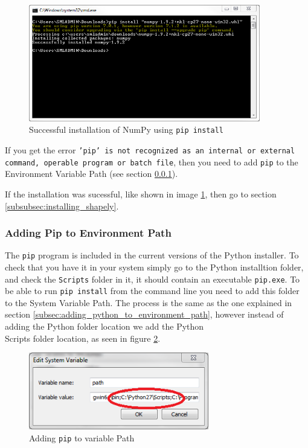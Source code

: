 \begin{figure}[h!]
  \centering
    \includegraphics[width=0.9\textwidth]{numpy_install_success}
    \caption{Successful installation of NumPy using \texttt{pip install} \label{fig:numpy_install_success} }
\end{figure}

If you get the error \texttt{'pip' is not recognized as an internal or external command, operable program or batch file}, then you need to add \texttt{pip} to the Environment Variable Path (see section \ref{subsubsec:adding_pip_to_path}).

If the installation was sucessful, like shown in image \ref{fig:numpy_install_success}, then go to section \ref{subsubsec:installing_shapely}.

\subsubsection{Adding Pip to Environment Path}
\label{subsubsec:adding_pip_to_path}

The \texttt{pip} program is included in the current versions of the Python installer. To check that you have it in your system simply go to the Python installtion folder, and check the \texttt{Scripts} folder in it, it should contain an executable \texttt{pip.exe}. To be able to run \texttt{pip install} from the command line you need to add this folder to the System Variable Path. The process is the same as the one explained in section \ref{subsec:adding_python_to_environment_path}, however instead of adding the Python folder location we add the Python\\Scripts folder location, as seen in figure \ref{fig:pip_install_environment_variable}.

\begin{figure}[h!]
  \centering
    \includegraphics[width=0.7\textwidth]{pip_install_environment_variable_highlighted}
    \caption{Adding \texttt{pip} to variable Path \label{fig:pip_install_environment_variable} }
\end{figure}

